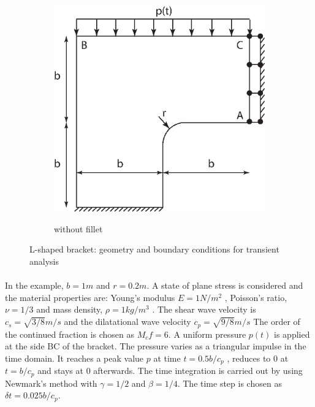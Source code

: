 \begin{figure}
\begin{subfigure}[b]{1\linewidth}
{                \includegraphics{isogeometric_sbfem/images/l_with_fillet_dynamic_geo_bc.eps}
            }
            \caption{without fillet}
        \end{subfigure}
        \caption{L-shaped bracket: geometry and boundary conditions for transient analysis}
        \label{iso_fig:l_dynamic_geo_bc}
    \end{figure}

\paragraph{}
In the example, $b=1m$ and $r=0.2m$.
A state of plane stress is considered and the material properties are:
    Young’s modulus $E = 1 N/m^2$ , Poisson’s ratio, $\nu = 1/3$ and mass density, $\rho = 1 kg/m^3$ .
    The shear wave velocity is $c_s=\sqrt{3/8}m/s$ and the dilatational wave velocity $c_p=\sqrt{9/8}m/s$
The order of the continued fraction is chosen as $M_cf = 6$.
A uniform pressure $p(t)$ is applied at the side BC of the bracket.
The pressure varies as a triangular impulse in the time domain.
It reaches a peak value $p$ at time $t= 0.5b/c_p$ , reduces to $0$ at $t = b/c_p$ and stays at $0$ afterwards.
The time integration is carried out by using Newmark's method with $\gamma = 1/2$ and $\beta = 1/4$.
The time step is chosen as $\delta t = 0.025b/c_p$.

